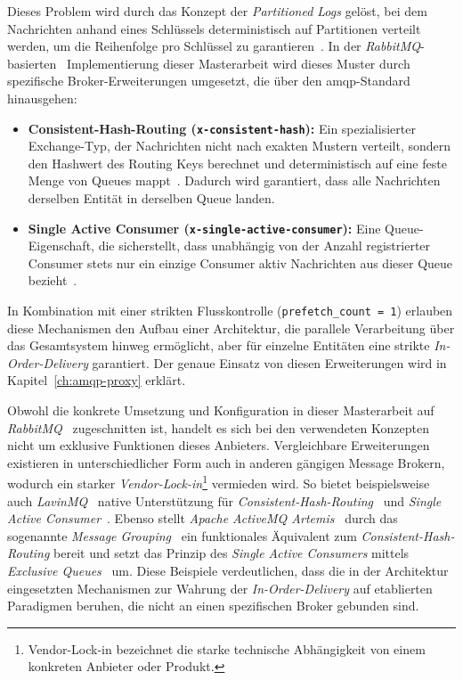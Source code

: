 Dieses Problem wird durch das Konzept der \textit{Partitioned Logs} gelöst, bei dem Nachrichten anhand eines Schlüssels deterministisch auf Partitionen verteilt werden, um die Reihenfolge pro Schlüssel zu garantieren~\citep{kleppmann2017designing}. In der \textit{RabbitMQ}-basierten~\citep{rabbitmq_broker} Implementierung dieser Masterarbeit wird dieses Muster durch spezifische Broker-Erweiterungen umgesetzt, die über den \gls{amqp}-Standard hinausgehen:

\begin{itemize}
    \item \textbf{Consistent-Hash-Routing (\texttt{x-consistent-hash}):} Ein spezialisierter Exchange-Typ, der Nachrichten nicht nach exakten Mustern verteilt, sondern den Hashwert des Routing Keys berechnet und deterministisch auf eine feste Menge von Queues mappt~\citep{rabbitmq_consistent_hash_exchange}. Dadurch wird garantiert, dass alle Nachrichten derselben Entität in derselben Queue landen.

    \item \textbf{Single Active Consumer (\texttt{x-single-active-consumer}):} Eine Queue-Eigenschaft, die sicherstellt, dass unabhängig von der Anzahl registrierter Consumer stets nur ein einzige Consumer aktiv Nachrichten aus dieser Queue bezieht~\citep{cogoluegnes2022rabbitmq}.
\end{itemize}

In Kombination mit einer strikten Flusskontrolle (\texttt{prefetch\_count = 1}) erlauben diese Mechanismen den Aufbau einer Architektur, die parallele Verarbeitung über das Gesamtsystem hinweg ermöglicht, aber für einzelne Entitäten eine strikte \textit{In-Order-Delivery} garantiert. Der genaue Einsatz von diesen Erweiterungen wird in Kapitel~\ref{ch:amqp-proxy} erklärt.

Obwohl die konkrete Umsetzung und Konfiguration in dieser Masterarbeit auf \textit{RabbitMQ}~\citep{rabbitmq_broker} zugeschnitten ist, handelt es sich bei den verwendeten Konzepten nicht um exklusive Funktionen dieses Anbieters. Vergleichbare Erweiterungen existieren in unterschiedlicher Form auch in anderen gängigen Message Brokern, wodurch ein starker \textit{Vendor-Lock-in}\footnote{Vendor-Lock-in bezeichnet die starke technische Abhängigkeit von einem konkreten Anbieter oder Produkt.} vermieden wird. So bietet beispielsweise auch \textit{LavinMQ}~\citep{lavinmq_broker} native Unterstützung für \textit{Consistent-Hash-Routing}~\citep{lavinmq_consistent_hash} und \textit{Single Active Consumer}~\citep{lavinmq_single_active_consumer}. Ebenso stellt \textit{Apache ActiveMQ Artemis}~\citep{artemis_broker} durch das sogenannte \textit{Message Grouping}~\citep{artemis_message_grouping} ein funktionales Äquivalent zum \textit{Consistent-Hash-Routing} bereit und setzt das Prinzip des \textit{Single Active Consumers} mittels \textit{Exclusive Queues}~\citep{artemis_exclusive_queues} um. Diese Beispiele verdeutlichen, dass die in der Architektur eingesetzten Mechanismen zur Wahrung der \textit{In-Order-Delivery} auf etablierten Paradigmen beruhen, die nicht an einen spezifischen Broker gebunden sind.

